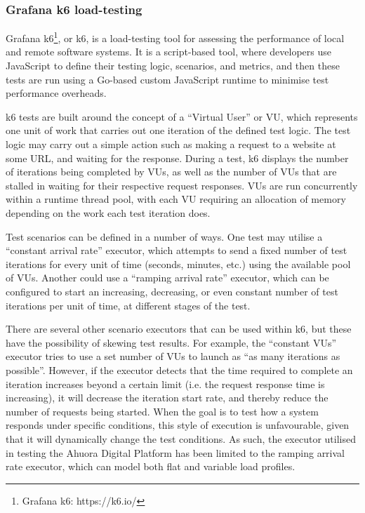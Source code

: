 \subsubsection{Grafana k6 load-testing}

Grafana k6\footnote{Grafana k6: https://k6.io/}, or k6, is a load-testing tool for assessing the performance of local and remote software systems. It is a script-based tool, where developers use JavaScript to define their testing logic, scenarios, and metrics, and then these tests are run using a Go-based custom JavaScript runtime to minimise test performance overheads.

k6 tests are built around the concept of a ``Virtual User'' or VU, which represents one unit of work that carries out one iteration of the defined test logic. The test logic may carry out a simple action such as making a request to a website at some URL, and waiting for the response. During a test, k6 displays the number of iterations being completed by VUs, as well as the number of VUs that are stalled in waiting for their respective request responses. VUs are run concurrently within a runtime thread pool, with each VU requiring an allocation of memory depending on the work each test iteration does.

Test scenarios can be defined in a number of ways. One test may utilise a ``constant arrival rate'' executor, which attempts to send a fixed number of test iterations for every unit of time (seconds, minutes, etc.) using the available pool of VUs. Another could use a ``ramping arrival rate'' executor, which can be configured to start an increasing, decreasing, or even constant number of test iterations per unit of time, at different stages of the test.

There are several other scenario executors that can be used within k6, but these have the possibility of skewing test results. For example, the ``constant VUs'' executor tries to use a set number of VUs to launch as ``as many iterations as possible''. However, if the executor detects that the time required to complete an iteration increases beyond a certain limit (i.e. the request response time is increasing), it will decrease the iteration start rate, and thereby reduce the number of requests being started. When the goal is to test how a system responds under specific conditions, this style of execution is unfavourable, given that it will dynamically change the test conditions. As such, the executor utilised in testing the Ahuora Digital Platform has been limited to the ramping arrival rate executor, which can model both flat and variable load profiles.

